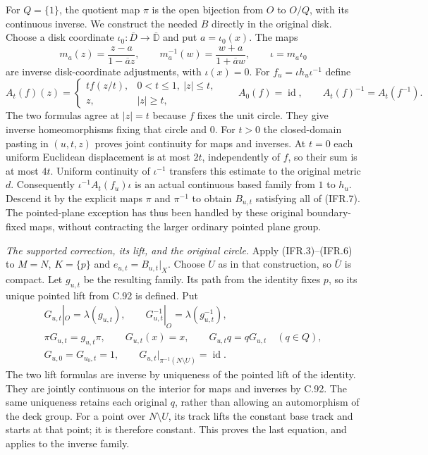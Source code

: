 \documentclass[11pt,a4paper]{article}
\DeclareMathOperator{\id}{id}\DeclareMathOperator{\im}{im}
\begin{document}
For $Q=\{1\}$, the quotient map $\pi$ is the open bijection
from $O$ to $O/Q$, with its continuous inverse. We construct the
needed $B$ directly in the original disk. Choose a disk coordinate
$\iota_0:\overline D\to\overline{\mathbb D}$ and put $a=\iota_0(x)$.
The maps
\[
 m_a(z)=\frac{z-a}{1-\overline a z},\qquad
 m_a^{-1}(w)=\frac{w+a}{1+\overline a w},\qquad
 \iota=m_a\iota_0
                                                               \tag{IFR.8}
\]
are inverse disk-coordinate adjustments, with $\iota(x)=0$.
For $f_u=\iota h_u\iota^{-1}$ define
\[
 A_t(f)(z)=
 \begin{cases}
  t f(z/t),&0<t\leq1,\ |z|\leq t,\\
  z,&|z|\geq t,
 \end{cases}
 \qquad A_0(f)=\id,\qquad A_t(f)^{-1}=A_t(f^{-1}).                \tag{IFR.9}
\]
The two formulas agree at $|z|=t$ because $f$ fixes the unit circle.
They give inverse homeomorphisms fixing that circle and $0$.
For $t>0$ the closed-domain pasting in $(u,t,z)$ proves joint
continuity for maps and inverses. At $t=0$ each uniform Euclidean
displacement is at most $2t$, independently of $f$, so their sum
is at most $4t$. Uniform continuity of $\iota^{-1}$ transfers
this estimate to the original metric $d$. Consequently
$\iota^{-1}A_t(f_u)\iota$ is an actual continuous based family
from $1$ to $h_u$. Descend it by the explicit maps $\pi$ and
$\pi^{-1}$ to obtain $B_{u,t}$ satisfying all of (IFR.7).
The pointed-plane exception has thus been handled by these original
boundary-fixed maps, without contracting the larger ordinary pointed
plane group.

\emph{The supported correction, its lift, and the original circle.}
Apply (IFR.3)--(IFR.6) to $M=N$, $K=\{p\}$ and
$e_{u,t}=B_{u,t}|_X$. Choose $U$ as in that construction, so
$\overline U$ is compact. Let $g_{u,t}$ be the resulting family.
Its path from the identity fixes $p$, so its unique pointed lift
from C.92 is defined. Put
\[
\begin{gathered}
 G_{u,t}|_O=\lambda(g_{u,t}),\qquad
 G_{u,t}^{-1}|_O=\lambda(g_{u,t}^{-1}),\\
 \pi G_{u,t}=g_{u,t}\pi,\qquad
 G_{u,t}(x)=x,\qquad G_{u,t}q=qG_{u,t}\quad(q\in Q),\\
 G_{u,0}=G_{u_0,t}=1,\qquad
 G_{u,t}|_{\pi^{-1}(N\setminus U)}=\id.
\end{gathered}                                                    \tag{IFR.10}
\]
The two lift formulas are inverse by uniqueness of the pointed lift
of the identity. They are jointly continuous on the interior for
maps and inverses by C.92. The same uniqueness retains each original
$q$, rather than allowing an automorphism of the deck group.
For a point over $N\setminus U$, its track lifts the constant
base track and starts at that point; it is therefore constant.
This proves the last equation, and applies to the inverse family.
\end{document}
